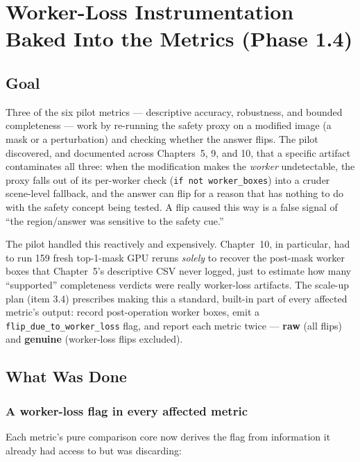 \chapter{Worker-Loss Instrumentation Baked Into the Metrics (Phase 1.4)}
\label{chap:p1-4}

\section{Goal}

Three of the six pilot metrics --- descriptive accuracy, robustness, and bounded completeness --- work
by re-running the safety proxy on a modified image (a mask or a perturbation) and checking whether the
answer flips. The pilot discovered, and documented across Chapters~5, 9, and 10, that a specific
artifact contaminates all three: when the modification makes the \emph{worker} undetectable, the proxy
falls out of its per-worker check (\texttt{if not worker\_boxes}) into a cruder scene-level fallback,
and the answer can flip for a reason that has nothing to do with the safety concept being tested. A
flip caused this way is a false signal of ``the region/answer was sensitive to the safety cue.''

The pilot handled this reactively and expensively. Chapter~10, in particular, had to run 159 fresh
top-1-mask GPU reruns \emph{solely} to recover the post-mask worker boxes that Chapter~5's descriptive
CSV never logged, just to estimate how many ``supported'' completeness verdicts were really
worker-loss artifacts. The scale-up plan (item 3.4) prescribes making this a standard, built-in part
of every affected metric's output: record post-operation worker boxes, emit a
\texttt{flip\_due\_to\_worker\_loss} flag, and report each metric twice --- \textbf{raw} (all flips) and
\textbf{genuine} (worker-loss flips excluded).

\section{What Was Done}

\subsection{A worker-loss flag in every affected metric}

Each metric's pure comparison core now derives the flag from information it already had access to but
was discarding:

